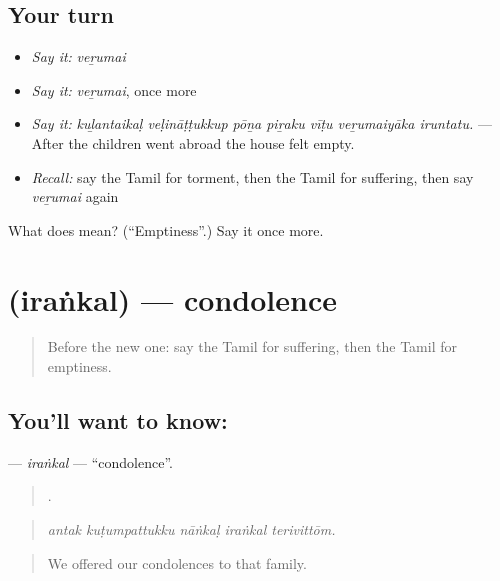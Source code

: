 \subsection*{Your turn}
\begin{itemize}
\raggedright
  \item \emph{Say it:} \emph{veṟumai}
  \item \emph{Say it:} \emph{veṟumai}, once more
  \item \emph{Say it:} \emph{kuḻantaikaḷ veḷināṭṭukkup pōṉa piṟaku vīṭu veṟumaiyāka iruntatu.} — After the children went abroad the house felt empty.
  \item \emph{Recall:} say the Tamil for torment, then the Tamil for suffering, then say \emph{veṟumai} again
\end{itemize}

\begin{tcolorbox}[breakable,colback=teal!4,colframe=teal!35!black,title={Before you move on}]
What does  mean? (\textquotedblleft{}Emptiness\textquotedblright{}.) Say it once more.
\end{tcolorbox}
\section[\texorpdfstring{\ta{இரங்கல்} (iraṅkal)}{இரங்கல் (iraṅkal)}]{ (iraṅkal) — condolence}

\label{lesson:TA-C463-irankal}



\begin{quote}
Before the new one: say the Tamil for suffering, then the Tamil for emptiness.
\end{quote}

\subsection*{You'll want to know: }
\textbf{} — \emph{iraṅkal} — \textquotedblleft{}condolence\textquotedblright{}.

\begin{quote}
    .
\end{quote}

\begin{quote}
\emph{antak kuṭumpattukku nāṅkaḷ iraṅkal terivittōm.}
\end{quote}

\begin{quote}
We offered our condolences to that family.
\end{quote}

